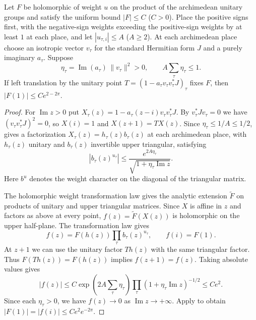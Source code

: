 \begin{lemma}
\label{lem:c-peak-transvection-bound}
\emitthmsource
Let $F$ be holomorphic of weight $u$ on the product of the archimedean unitary groups and satisfy the uniform bound $|F|\le C$ ($C>0$). Place the positive signs first, with the negative-sign weights exceeding the positive-sign weights by at least $1$ at each place, and let $|u_{\tau,i}|\le A$ ($A\ge2$). At each archimedean place choose an isotropic vector $v_\tau$ for the standard Hermitian form $J$ and a purely imaginary $a_\tau$. Suppose
\[
 \eta_\tau=\operatorname{Im}(a_\tau)\,\|v_\tau\|^2>0,
 \qquad A\sum_\tau\eta_\tau\le1 .
\]
If left translation by the unitary point $T=(1-a_\tau v_\tau v_\tau^*J)_\tau$ fixes $F$, then $|F(1)|\le C e^{2-2\pi}$.
\end{lemma}

\begin{proof}
For $\operatorname{Im}z>0$ put $X_\tau(z)=1-a_\tau(z-i)v_\tau v_\tau^*J$. By $v_\tau^*Jv_\tau=0$ we have $(v_\tau v_\tau^*J)^2=0$, so $X(i)=1$ and $X(z+1)=TX(z)$. Since $\eta_\tau\le1/A\le1/2$,  gives a factorization $X_\tau(z)=h_\tau(z)b_\tau(z)$ at each archimedean place, with $h_\tau(z)$ unitary and $b_\tau(z)$ invertible upper triangular, satisfying
\[
      |b_\tau(z)^{u_\tau}|
      \le \frac{e^{2A\eta_\tau}}{\sqrt{1+\eta_\tau\operatorname{Im}z}} .
\]
Here $b^u$ denotes the weight character on the diagonal of the triangular matrix.

The holomorphic weight transformation law gives the analytic extension $\widetilde F$ on products of unitary and upper triangular matrices. Since $X$ is affine in $z$ and factors as above at every point, $f(z)=\widetilde F(X(z))$ is holomorphic on the upper half-plane. The transformation law gives
\[
 f(z)=F(h(z))\prod_\tau b_\tau(z)^{u_\tau},\qquad f(i)=F(1).
\]
At $z+1$ we can use the unitary factor $Th(z)$ with the same triangular factor. Thus $F(Th(z))=F(h(z))$ implies $f(z+1)=f(z)$. Taking absolute values gives
\[
 |f(z)|\le C\exp\!\left(2A\sum_\tau\eta_\tau\right)
       \prod_\tau(1+\eta_\tau\operatorname{Im}z)^{-1/2}
       \le C e^2.
\]
Since each $\eta_\tau>0$, we have $f(z)\to0$ as $\operatorname{Im}z\to+\infty$. Apply  to obtain $|F(1)|=|f(i)|\le C e^2 e^{-2\pi}$.
\end{proof}

